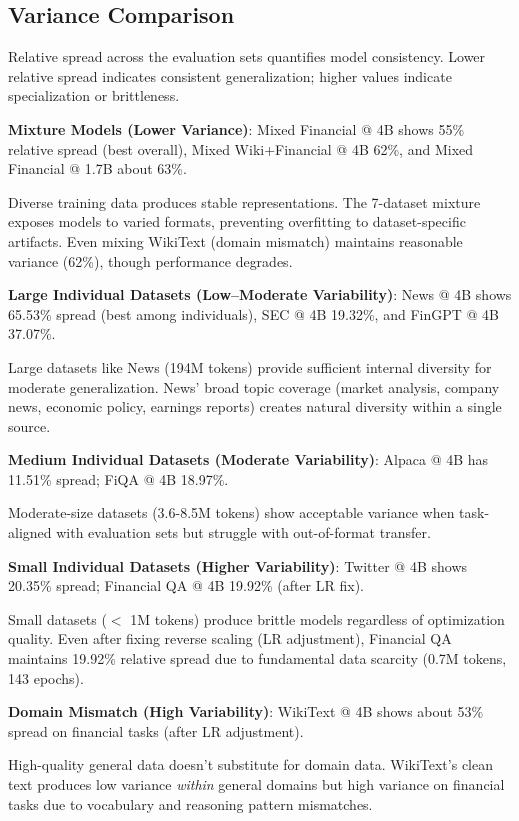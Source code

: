\subsection{Variance Comparison}

Relative spread across the evaluation sets quantifies model consistency. Lower relative spread indicates consistent generalization; higher values indicate specialization or brittleness.

\textbf{Mixture Models (Lower Variance)}: Mixed Financial @ 4B shows 55\% relative spread (best overall), Mixed Wiki+Financial @ 4B 62\%, and Mixed Financial @ 1.7B about 63\%.

Diverse training data produces stable representations. The 7-dataset mixture exposes models to varied formats, preventing overfitting to dataset-specific artifacts. Even mixing WikiText (domain mismatch) maintains reasonable variance (62\%), though performance degrades.

\textbf{Large Individual Datasets (Low–Moderate Variability)}: News @ 4B shows 65.53\% spread (best among individuals), SEC @ 4B 19.32\%, and FinGPT @ 4B 37.07\%.

Large datasets like News (194M tokens) provide sufficient internal diversity for moderate generalization. News' broad topic coverage (market analysis, company news, economic policy, earnings reports) creates natural diversity within a single source.

\textbf{Medium Individual Datasets (Moderate Variability)}: Alpaca @ 4B has 11.51\% spread; FiQA @ 4B 18.97\%.

Moderate-size datasets (3.6-8.5M tokens) show acceptable variance when task-aligned with evaluation sets but struggle with out-of-format transfer.

\textbf{Small Individual Datasets (Higher Variability)}: Twitter @ 4B shows 20.35\% spread; Financial QA @ 4B 19.92\% (after LR fix).

Small datasets ($<$ 1M tokens) produce brittle models regardless of optimization quality. Even after fixing reverse scaling (LR adjustment), Financial QA maintains 19.92\% relative spread due to fundamental data scarcity (0.7M tokens, 143 epochs).

\textbf{Domain Mismatch (High Variability)}: WikiText @ 4B shows about 53\% spread on financial tasks (after LR adjustment).

High-quality general data doesn't substitute for domain data. WikiText's clean text produces low variance \textit{within} general domains but high variance on financial tasks due to vocabulary and reasoning pattern mismatches.

